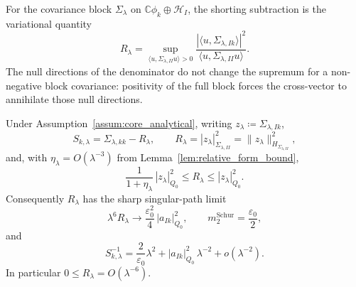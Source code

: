 For the covariance block $\Sigma_\lambda$ on
$\mathbb{C}\phi_k\oplus\mathcal{H}_I$, the shorting subtraction is the
variational quantity
\begin{equation}
 R_\lambda
 =
 \sup_{\langle u,\Sigma_{\lambda,II}u\rangle>0}
 \frac{|\langle u,\Sigma_{\lambda,Ik}\rangle|^2}
      {\langle u,\Sigma_{\lambda,II}u\rangle}.
 \label{eq:schur_variational}
\end{equation}
The null directions of the denominator do not change the supremum for a
non-negative block covariance: positivity of the full block forces the
cross-vector to annihilate those null directions.

\begin{proposition}
\label{prop:rank_one_shorted_residual}
Under Assumption~\ref{assum:core_analytical}, writing
$z_\lambda\coloneqq\Sigma_{\lambda,Ik}$,
\begin{equation}
  S_{k,\lambda}
  =\Sigma_{\lambda,kk}-R_\lambda,
  \qquad
  R_\lambda
  =|z_\lambda|_{\Sigma_{\lambda,II}}^2
  =\|z_\lambda\|_{H_{\Sigma_{\lambda,II}}}^2,
  \label{eq:shorting_residual_energy_identity}
\end{equation}
and, with $\eta_\lambda=O(\lambda^{-3})$ from
Lemma~\ref{lem:relative_form_bound},
\begin{equation}
  \frac{1}{1+\eta_\lambda}\,|z_\lambda|_{Q_0}^2
  \le R_\lambda
  \le |z_\lambda|_{Q_0}^2 .
  \label{eq:shorted_residual_bound}
\end{equation}
Consequently $R_\lambda$ has the sharp singular-path limit
\begin{equation}
  \lambda^6 R_\lambda\longrightarrow\frac{\varepsilon_0^2}{4}\,|a_{Ik}|_{Q_0}^2,
  \qquad
  m_2^{\mathrm{Schur}}=\frac{\varepsilon_0}{2},
  \label{eq:Schur_asympt}
\end{equation}
and
\[
  S_{k,\lambda}^{-1}
  =
  \frac{2}{\varepsilon_0}\lambda^2
  +|a_{Ik}|_{Q_0}^2\,\lambda^{-2}+o(\lambda^{-2}).
\]
In particular $0\le R_\lambda=O(\lambda^{-6})$.
\end{proposition}

